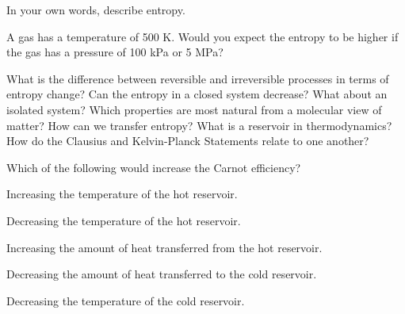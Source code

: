 \begin{homework}
  \question In your own words, describe entropy.

  \question A gas has a temperature of 500 K.  Would you expect the entropy to be higher if the gas has a pressure of 100 kPa or 5 MPa?


  \question What is the difference between reversible and irreversible processes in terms of entropy change?
  \question Can the entropy in a closed system decrease?  What about an isolated system?
  \question Which properties are most natural from a molecular view of matter?
  \question How can we transfer entropy?
  \question What is a reservoir in thermodynamics?
  \question How do the Clausius and Kelvin-Planck Statements relate to one another?

  \question Which of the following would increase the Carnot efficiency?
  \begin{questionparts}
  \item Increasing the temperature of the hot reservoir.
  \item Decreasing the temperature of the hot reservoir.
  \item Increasing the amount of heat transferred from the hot reservoir.
  \item Decreasing the amount of heat transferred to the cold reservoir.
  \item Decreasing the temperature of the cold reservoir.
  \end{questionparts}
  

\end{homework}
